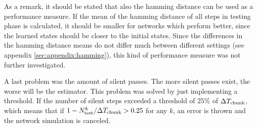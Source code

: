 As a remark, it should be stated that also the hamming distance can be used as a performance measure. If the mean of the hamming distance of all steps in testing phase is calculated, it should be smaller for networks which perform better, since the learned states should be closer to the initial states. Since the differences in the hamming distance means do not differ much between different settings (see appendix \ref{sec:appendix:hamming}), this kind of performance measure was not further investigated.

A last problem was the amount of silent passes. The more silent passes exist, the worse will be the estimator. This problem was solved by just implementing a threshold. If the number of silent steps exceeded a threshold of $25\%$ of $\Delta T_{\text{chunk}}$, which means that if $1 - N_{\text{test}}^k/\Delta T_{\text{chunk}} > 0.25$ for any $k$, an error is thrown and the network simulation is canceled.

